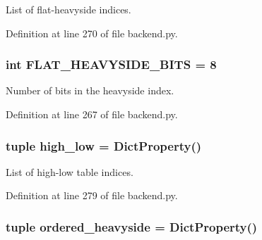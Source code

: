 List of flat-\/heavyside indices. 



Definition at line 270 of file backend.py.

\hypertarget{classbackend_1_1_matcher_a489df5b5c1e345f76ee524685e0856c1}{
\subsubsection[{FLAT\_\-HEAVYSIDE\_\-BITS}]{\setlength{\rightskip}{0pt plus 5cm}int {\bf FLAT\_\-HEAVYSIDE\_\-BITS} = 8}}
\label{classbackend_1_1_matcher_a489df5b5c1e345f76ee524685e0856c1}


Number of bits in the heavyside index. 



Definition at line 267 of file backend.py.

\hypertarget{classbackend_1_1_matcher_abbbeca0d3792b2ad0d9046572fd7f16f}{
\subsubsection[{high\_\-low}]{\setlength{\rightskip}{0pt plus 5cm}tuple {\bf high\_\-low} = {\bf DictProperty}()}}
\label{classbackend_1_1_matcher_abbbeca0d3792b2ad0d9046572fd7f16f}


List of high-\/low table indices. 



Definition at line 279 of file backend.py.

\hypertarget{classbackend_1_1_matcher_a57274e1e90ee992a9ae6b89edb934a43}{
\subsubsection[{ordered\_\-heavyside}]{\setlength{\rightskip}{0pt plus 5cm}tuple {\bf ordered\_\-heavyside} = {\bf DictProperty}()}}
\label{classbackend_1_1_matcher_a57274e1e90ee992a9ae6b89edb934a43}


